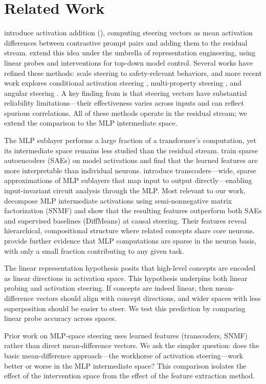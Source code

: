 \section{Related Work}
\label{sec:related}

\citet{turner2023activation} introduce activation addition (\actadd), computing steering vectors as mean activation differences between contrastive prompt pairs and adding them to the residual stream. \citet{zou2023representation} extend this idea under the umbrella of representation engineering, using linear probes and interventions for top-down model control. Several works have refined these methods: \citet{rimsky2024steering} scale steering to safety-relevant behaviors, and more recent work explores conditional activation steering \citep{lee2024programming}, multi-property steering \citep{wang2024multi}, and angular steering \citep{wang2025angular}. A key finding from \citet{tan2024analyzing} is that steering vectors have substantial reliability limitations---their effectiveness varies across inputs and can reflect spurious correlations. All of these methods operate in the residual stream; we extend the comparison to the MLP intermediate space.

The MLP sublayer performs a large fraction of a transformer's computation, yet its intermediate space remains less studied than the residual stream. \citet{cunningham2023sparse} train sparse autoencoders (SAEs) on model activations and find that the learned features are more interpretable than individual neurons. \citet{dunefsky2024transcoders} introduce transcoders---wide, sparse approximations of MLP sublayers that map input to output directly---enabling input-invariant circuit analysis through the MLP. Most relevant to our work, \citet{shafran2025decomposing} decompose MLP intermediate activations using semi-nonnegative matrix factorization (SNMF) and show that the resulting features outperform both SAEs and supervised baselines (DiffMeans) at causal steering. Their features reveal hierarchical, compositional structure where related concepts share core neurons. \citet{marks2026language} provide further evidence that MLP computations are sparse in the neuron basis, with only a small fraction contributing to any given task.

The linear representation hypothesis \citep{nanda2023emergent, park2024linear} posits that high-level concepts are encoded as linear directions in activation space. This hypothesis underpins both linear probing and activation steering. If concepts are indeed linear, then mean-difference vectors should align with concept directions, and wider spaces with less superposition should be easier to steer. We test this prediction by comparing linear probe accuracy across spaces.

Prior work on MLP-space steering uses learned features (transcoders, SNMF) rather than direct mean-difference vectors. We ask the simpler question: does the basic mean-difference approach---the workhorse of activation steering---work better or worse in the MLP intermediate space? This comparison isolates the effect of the intervention space from the effect of the feature extraction method.
